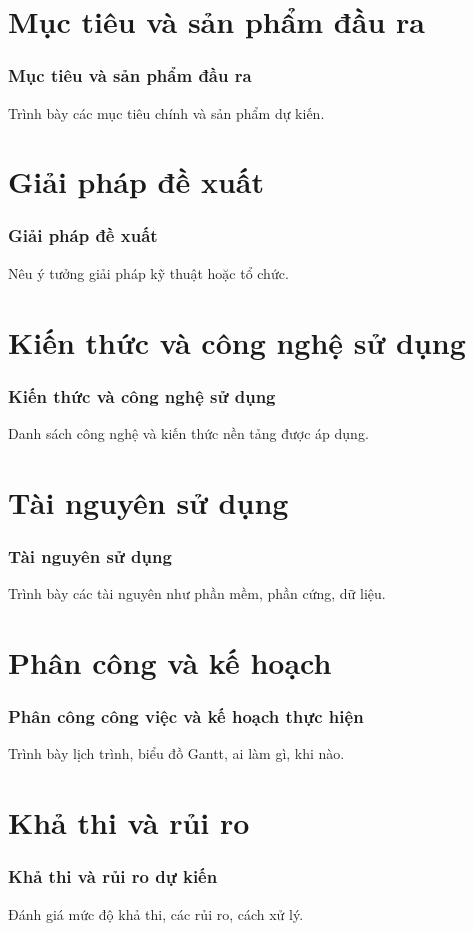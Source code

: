\section{Mục tiêu và sản phẩm đầu ra}
\begin{frame}
    \frametitle{Mục tiêu và sản phẩm đầu ra}
    Trình bày các mục tiêu chính và sản phẩm dự kiến.
\end{frame}

\section{Giải pháp đề xuất}
\begin{frame}
    \frametitle{Giải pháp đề xuất}
    Nêu ý tưởng giải pháp kỹ thuật hoặc tổ chức.
\end{frame}

\section{Kiến thức và công nghệ sử dụng}
\begin{frame}
    \frametitle{Kiến thức và công nghệ sử dụng}
    Danh sách công nghệ và kiến thức nền tảng được áp dụng.
\end{frame}

\section{Tài nguyên sử dụng}
\begin{frame}
    \frametitle{Tài nguyên sử dụng}
    Trình bày các tài nguyên như phần mềm, phần cứng, dữ liệu.
\end{frame}

\section{Phân công và kế hoạch}
\begin{frame}
    \frametitle{Phân công công việc và kế hoạch thực hiện}
    Trình bày lịch trình, biểu đồ Gantt, ai làm gì, khi nào.
\end{frame}

\section{Khả thi và rủi ro}
\begin{frame}
    \frametitle{Khả thi và rủi ro dự kiến}
    Đánh giá mức độ khả thi, các rủi ro, cách xử lý.
\end{frame}


